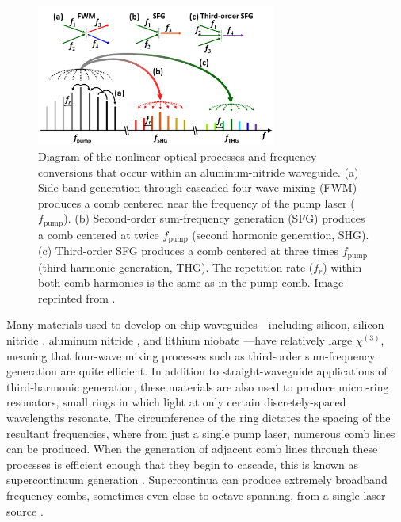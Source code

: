 \begin{figure}
    \centering
    \includegraphics[width=0.7\textwidth]{figures-3/nonlinearity.pdf}
    \caption[Alumninum nitride frequency conversion diagram]{Diagram of the nonlinear optical processes and frequency conversions that occur within an aluminum-nitride waveguide. (a) Side-band generation through cascaded four-wave mixing (FWM) produces a comb centered near the frequency of the pump laser ($f_\mathrm{pump}$). (b) Second-order sum-frequency generation (SFG) produces a comb centered at twice $f_\mathrm{pump}$ (second harmonic generation, SHG). (c) Third-order SFG produces a comb centered at three times $f_\mathrm{pump}$ (third harmonic generation, THG). The repetition rate ($f_r$) within both comb harmonics is the same as in the pump comb. Image reprinted from \cite{jung_green_2014}.}
    \label{fig:nonlinearity}
\end{figure}

Many materials used to develop on-chip waveguides---including silicon\linebreak \citep{leuthold_nonlinear_2010}, silicon nitride \citep{moss_new_2013}, aluminum nitride \citep{jung_aluminum_2016}, and lithium niobate \citep{zhang_monolithic_2017}---have relatively large $\chi^{(3)}$, meaning that four-wave mixing processes such as third-order sum-frequency generation are quite efficient. In addition to straight-waveguide applications of third-harmonic generation, these materials are also used to produce micro-ring resonators, small rings in which light at only certain discretely-spaced wavelengths resonate. The circumference of the ring dictates the spacing of the resultant frequencies, where from just a single pump laser, numerous comb lines can be produced. When the generation of adjacent comb lines through these processes is efficient enough that they begin to cascade, this is known as supercontinuum generation \citep{dudley_supercontinuum_2006}. Supercontinua can produce extremely broadband frequency combs, sometimes even close to octave-spanning, from a single laser source \citep[e.g.][]{li_stably_2017, gong_near-octave_2020}.

